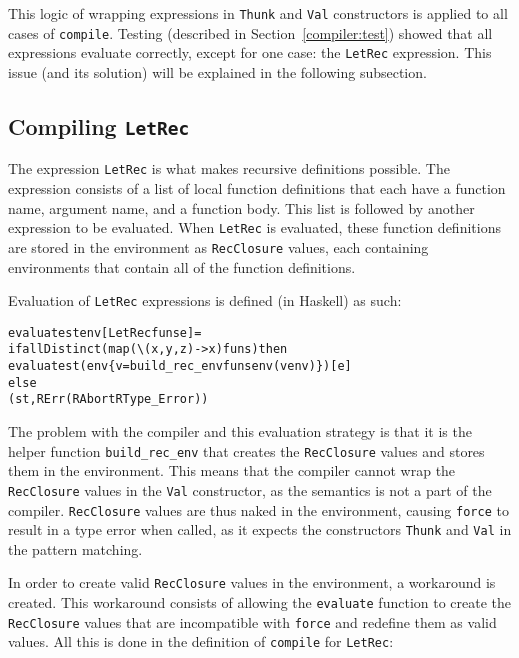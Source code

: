 This logic of wrapping expressions in \texttt{Thunk} and \texttt{Val}
constructors is applied to all cases of \texttt{compile}. Testing (described in
Section~\ref{compiler:test}) showed that all
expressions evaluate correctly, except for one case: the \texttt{LetRec}
expression. This issue (and its solution) will be explained in the following
subsection.

\subsection{Compiling \texttt{LetRec}}
\label{com:letrec}
The expression \texttt{LetRec} is what makes recursive definitions possible.
The expression consists of a list of local function definitions that each have a
function name, argument name, and a function body. This list is followed by
another expression to be evaluated. When \texttt{LetRec} is evaluated, these
function definitions
are stored in the environment as \texttt{RecClosure} values, each containing
environments that contain all of the function definitions.

Evaluation of \texttt{LetRec} expressions is defined (in Haskell) as such:

\begin{alltt}
  evaluate st env [LetRec funs e] =
    if allDistinct (map (\textbackslash(x,y,z) -> x) funs) then
      evaluate st (env \{v = build_rec_env funs env (v env)\}) [e]
    else
      (st, RErr (RAbort RType_Error))
\end{alltt}

\noindent The problem with the compiler and this evaluation strategy is that it
is the helper function \texttt{build\_rec\_env} that
creates the \texttt{RecClosure} values and stores them in the environment. This
means that the compiler cannot wrap the \texttt{RecClosure} values in the
\texttt{Val} constructor, as the semantics is not a part of the compiler.
\texttt{RecClosure} values are thus naked in the environment, causing \texttt{force}
to result in a type error when called, as it expects the constructors
\texttt{Thunk} and \texttt{Val} in the pattern matching.

In order to create valid \texttt{RecClosure} values in the environment, a
workaround is created. This workaround
consists of allowing the \texttt{evaluate} function to create the
\texttt{RecClosure} values that are incompatible with \texttt{force} and
redefine them as valid values.
All this is done in the definition of
\texttt{compile} for \texttt{LetRec}:

